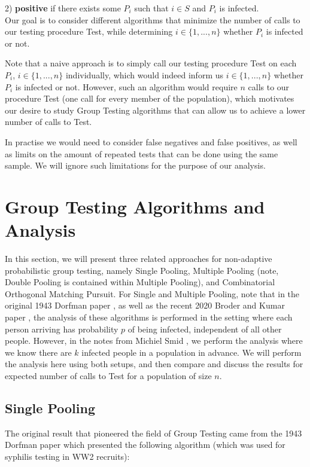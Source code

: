 \documentclass[12pt]{article}
\begin{document}
2) \textbf{positive} if there exists some $P_i$ such that $i \in S$ and $P_i$ is infected. \\

Our goal is to consider different algorithms that minimize the number of calls to our testing procedure {\sf Test}, while determining \forall $i \in \{1,...,n\}$ whether $P_i$ is infected or not.

Note that a naive approach is to simply call our testing procedure {\sf Test} on each $P_i$, $i \in \{1,...,n\}$ individually, which would indeed inform us \forall $i \in \{1,...,n\}$ whether $P_i$ is infected or not. However, such an algorithm would require $n$ calls to our procedure {\sf Test} (one call for every member of the population), which motivates our desire to study Group Testing algorithms that can allow us to achieve a lower number of calls to {\sf Test}.

In practise we would need to consider false negatives and false positives, as well as limits on the amount of repeated tests that can be done using the same sample. We will ignore such limitations for the purpose of our analysis.


\section{Group Testing Algorithms and Analysis}
In this section, we will present three related approaches for non-adaptive probabilistic group testing, namely Single Pooling, Multiple Pooling (note, Double Pooling is contained within Multiple Pooling), and Combinatorial Orthogonal Matching Pursuit.
For Single and Multiple Pooling, note that in the original 1943 Dorfman paper \cite{D1943}, as well as the recent 2020 Broder and Kumar paper \cite{BK2020}, the analysis of these algorithms is performed in the setting where each person arriving has probability $p$ of being infected, independent of all other people. However, in the notes from Michiel Smid \cite{Michiel}, we perform the analysis where we know there are $k$ infected people in a population in advance.
We will perform the analysis here using both setups, and then compare and discuss the results for expected number of calls to {\sf Test} for a population of size $n$.

\subsection{Single Pooling}
The original result that pioneered the field of Group Testing came from the 1943 Dorfman paper which presented the following algorithm (which was used for syphilis testing in WW2 recruits):
\end{document}
